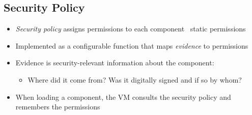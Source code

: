 \documentclass[12pt,titlepage,a4paper]{report}
\begin{document}
	\subsection{Security Policy}
	\begin{itemize}
		\item \textit{Security policy} assigns permissions to each component \textrightarrow \, static permissions
		\item Implemented as a configurable function that maps \textit{evidence} to permissions
		\item Evidence is security-relevant information about the component:
		\begin{itemize}
			\item Where did it come from? Was it digitally signed and if so by whom?
		\end{itemize}
		\item When loading a component, the VM consults the security policy and remembers the permissions
	\end{itemize}
\end{document}
